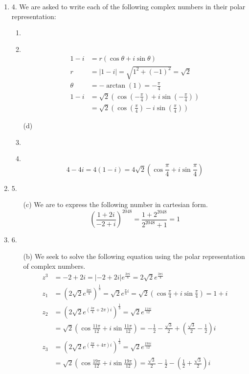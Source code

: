 \documentclass[fleqn]{article}
\newenvironment{answers}{ %
	\begin{enumerate}
		\setlength{\itemsep}{\bigskipamount}
}{\end{enumerate}}
\newcommand\Item[1][]{ %
  \ifx\relax#1\relax  \item \else \item[#1] \fi
  \abovedisplayskip=0pt\abovedisplayshortskip=0pt~\vspace*{-\baselineskip}}
\begin{document}
\begin{answers}
	\item[4.]
		We are asked to write each of the following complex numbers in their polar representation:
		\begin{enumerate}
			\Item[(b)]
				\begin{align*}
					1 - i  & = r (\cos \theta + i \sin \theta) \\
					r      & = |1 - i| = \sqrt{1^2 + (-1)^2} = \sqrt{2} \\
					\theta & = -\arctan(1) = -\frac{\pi}{4} \\
					1 - i  & = \sqrt{2}\left( \cos\left( -\frac{\pi}{4} \right) + i\sin\left( -\frac{\pi}{4} \right) \right) \\
					       & = \sqrt{2}\left( \cos\left( \frac{\pi}{4} \right) - i\sin\left( \frac{\pi}{4} \right) \right)
				\end{align*}

			\Item[(d)]
				\begin{equation*}
					4 - 4i = 4(1 - i) = 4\sqrt{2}\left( \cos\frac{\pi}{4} + i\sin\frac{\pi}{4} \right)
				\end{equation*}
		\end{enumerate}

	\item[5.]
		\begin{enumerate}
			\item[(c)]
				We are to express the following number in cartesian form.
				\begin{equation*}
					\left( \frac{1+2i}{-2+i} \right)^{2048} = \frac{1+2^{2048}}{2^{2048}+1} = 1
				\end{equation*}
		\end{enumerate}

	\item[6.]
		\begin{enumerate}
			\item[(b)]
				We seek to solve the following equation using the polar representation of complex numbers.
				\begin{align*}
					z^3 & = -2 + 2i = |-2+2i|e^{\frac{3\pi i}{4}} = 2\sqrt{2}e^{\frac{3\pi i}{4}} \\
					z_1 & = \left( 2\sqrt{2}e^{\frac{3\pi i}{4}} \right)^\frac{1}{3} = \sqrt{2}e^{\frac{\pi}{4}i}  = \sqrt{2}\left( \cos\frac{\pi}{4} + i\sin\frac{\pi}{4} \right) = 1 + i \\
					z_2 & = \left( 2\sqrt{2}e^{\left( \frac{3\pi}{4} + 2\pi \right) i} \right)^\frac{1}{3} = \sqrt{2}e^{\frac{11\pi i}{12}} \\
					    & =  \sqrt{2}\left( \cos\frac{11\pi}{12} + i\sin\frac{11\pi}{12} \right) = -\frac{1}{2} - \frac{\sqrt{3}}{2} + \left( \frac{\sqrt{3}}{2} - \frac{1}{2} \right) i \\
					z_3 & = \left( 2\sqrt{2}e^{\left( \frac{3\pi}{4} + 4\pi \right) i} \right)^\frac{1}{3} = \sqrt{2}e^{\frac{19\pi i}{12}} \\
					    & = \sqrt{2} \left( \cos\frac{19\pi}{12} + i\sin\frac{19\pi}{12} \right) = \frac{\sqrt{3}}{2} - \frac{1}{2} - \left( \frac{1}{2} + \frac{\sqrt{3}}{2} \right) i
				\end{align*}
		\end{enumerate}


\end{answers}
\end{document}
